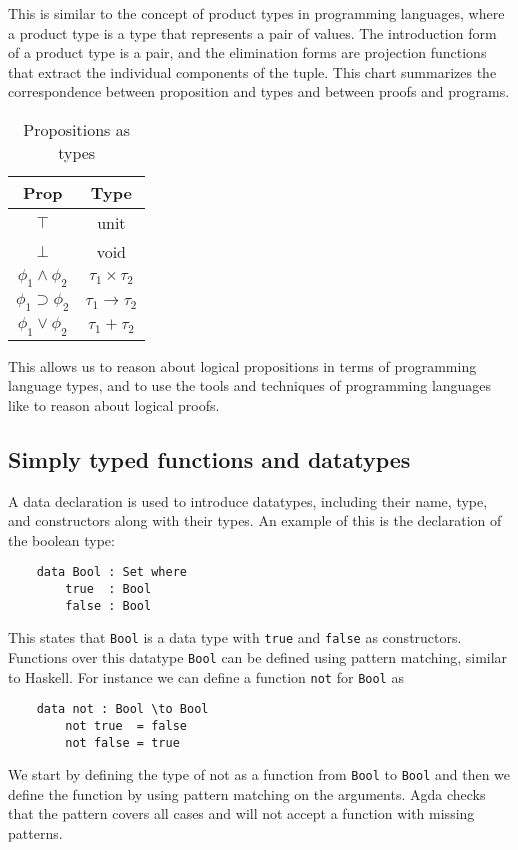 \documentclass[titlepage]{article}
\begin{document}
This is similar to the concept of product types in programming languages, where a product type is a type that represents a pair of values. The introduction form of a product type is a pair, and the elimination forms are projection functions that extract the individual components of the tuple. This chart summarizes the correspondence between proposition and types and between proofs and programs.

\begin{table}[h!]
    \centering
    \begin{tabular}{c | c}
        Prop & Type \\
        \hline
        $\top$ & unit \\
        $\bot$ & void \\
        $\phi_1 \wedge \phi_2$ & $\tau_1 \times \tau_2$ \\
        $\phi_1 \supset \phi_2$ & $\tau_1 \to \tau_2$ \\
        $\phi_1 \vee \phi_2$ & $\tau_1 + \tau_2$
    \end{tabular}
    \caption{Propositions as types}
\end{table}

This allows us to reason about logical propositions in terms of programming language types, and to use the tools and techniques of programming languages like \Agda to reason about logical proofs.

\subsection{Simply typed functions and datatypes}
A data declaration is used to introduce datatypes, including their name, type, and constructors along with their types. An example of this is the declaration of the boolean type:
\begin{verbatim}
    data Bool : Set where
        true  : Bool
        false : Bool
\end{verbatim}
This states that \texttt{Bool} is a data type with \texttt{true} and \texttt{false} as constructors. Functions over this datatype \texttt{Bool} can be defined using pattern matching, similar to Haskell. For instance we can define a function \texttt{not} for \texttt{Bool} as
\begin{verbatim}
    data not : Bool \to Bool
        not true  = false
        not false = true
\end{verbatim}
We start by defining the type of not as a function from \texttt{Bool} to \texttt{Bool} and then we define the function by using pattern matching on the arguments. Agda checks that the pattern covers all cases and will not accept a function with missing patterns.
\end{document}
